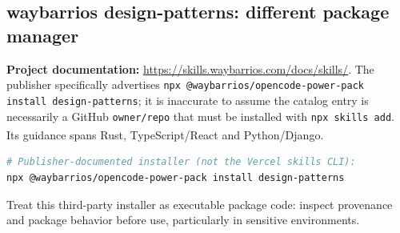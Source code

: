 \documentclass[11pt,letterpaper]{article}
\newcommand{\src}[1]{\textsuperscript{\textcolor{teal}{\cite{#1}}}}
\begin{document}
\subsection{waybarrios design-patterns: different package manager}
\textbf{Project documentation:} \url{https://skills.waybarrios.com/docs/skills/}. The publisher specifically advertises \texttt{npx @waybarrios/opencode-power-pack install design-patterns}; it is inaccurate to assume the catalog entry is necessarily a GitHub \texttt{owner/repo} that must be installed with \texttt{npx skills add}. Its guidance spans Rust, TypeScript/React and Python/Django.\src{waybarrios}
\begin{lstlisting}[language=bash]
# Publisher-documented installer (not the Vercel skills CLI):
npx @waybarrios/opencode-power-pack install design-patterns
\end{lstlisting}
Treat this third-party installer as executable package code: inspect provenance and package behavior before use, particularly in sensitive environments.
\end{document}
